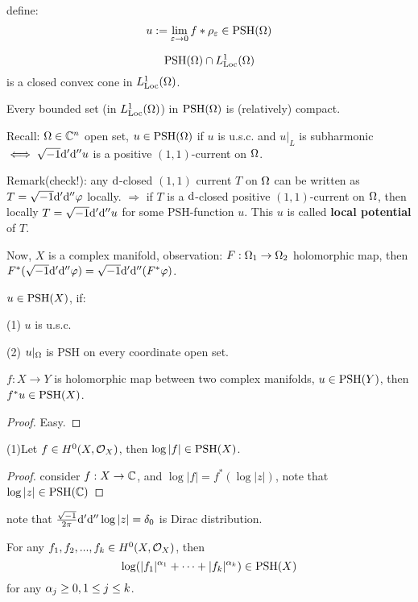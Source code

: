 define:
$$u:=\lim_{\varepsilon\to 0}
f*\rho_\varepsilon\in\operatorname{PSH}(\Omega)
$$

\begin{cor}
$$\operatorname{PSH}(\Omega)\cap L_{\operatorname{Loc}}^1(\Omega)$$
is a closed convex cone in $L^1_{\operatorname{Loc}}(\Omega)$.

Every bounded set (in $L^1_{\operatorname{Loc}}(\Omega)$) in $\operatorname{PSH}(\Omega)$
is (relatively) compact.
\end{cor}


Recall: $\Omega\in\mathbb{C}^n$ open set,
$u\in\operatorname{PSH}(\Omega)$ if $u$ is u.s.c. and $u|_L$
is subharmonic $\iff\sqrt{-1}\mathrm{d}'\mathrm{d}'' u$ is a positive $(1,1)$-current on $\Omega$.

Remark(check!): any $\mathrm{d}$-closed $(1,1)$ current $T$
on $\Omega$ can be written as $T=\sqrt{-1}\mathrm{d}'\mathrm{d}''\varphi$ locally.
$\Rightarrow$ if $T$ is a $\mathrm{d}$-closed positive $(1,1)$-current on $\Omega$,
then locally $T=\sqrt{-1}\mathrm{d}'\mathrm{d}''u$ for some PSH-function $u$.
This $u$ is called \textbf{local potential} of $T$.

Now, $X$ is a complex manifold,
observation: $F:\Omega_1\to\Omega_2$ holomorphic map,
then $F^*(\sqrt{-1}\mathrm{d}'\mathrm{d}''\varphi)=\sqrt{-1}\mathrm{d}'\mathrm{d}''(F^*\varphi)$.

\begin{definition}
$u\in\operatorname{PSH}(X)$, if:

(1) $u$ is u.s.c.

(2) $u|_\Omega$ is PSH on every coordinate open set.
\end{definition}

\begin{prop}
$f:X\to Y$ is holomorphic map between two complex manifolds,
$u\in\operatorname{PSH}(Y)$, then $f^*u\in\operatorname{PSH}(X)$.
\end{prop}

\begin{proof}
Easy.
\end{proof}

\begin{example}
(1)Let $f\in H^0(X,\mathcal{O}_X)$, then
$\log |f|\in\operatorname{PSH}(X)$.
\end{example}

\begin{proof}
consider $f:X\to \mathbb{C}$, and
$\log|f|=f^*(\log|z|)$, note that
$\log|z|\in\operatorname{PSH}(\mathbb{C})$
\end{proof}
note that $\frac{\sqrt{-1}}{2\pi}\mathrm{d}'\mathrm{d}''\log|z|=\delta_0$ is Dirac distribution.

\begin{example}For any $f_1,f_2,...,f_k\in H^0(X,\mathcal{O}_X)$, then
$$\log(|f_1|^{\alpha_1}+\cdots+|f_k|^{\alpha_k})\in\operatorname{PSH}(X)$$
for any $\alpha_j\geq 0,1\leq j\leq k$.
\end{example}

